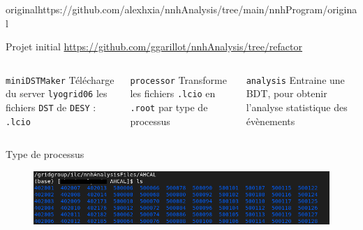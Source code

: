 \documentclass[9pt]{beamer}
\begin{document}
\begin{frame}{original}{https://github.com/alexhxia/nnhAnalysis/tree/main/nnhProgram/original}

\begin{block}{Projet initial}
	\url{https://github.com/ggarillot/nnhAnalysis/tree/refactor}
\end{block}

\begin{columns}

	\begin{column}{0.33\textwidth}
		\begin{block}{\texttt{miniDSTMaker}}
			Télécharge du server \texttt{lyogrid06} les fichiers \texttt{DST} de \texttt{DESY} : \texttt{.lcio}
		\end{block}
	\end{column}
	
	\begin{column}{0.33\textwidth}
		\begin{block}{\texttt{processor}}
			Transforme les fichiers \texttt{.lcio} en \texttt{.root} par type de processus
		\end{block}
	\end{column}
	
	\begin{column}{0.33\textwidth}
		\begin{block}{\texttt{analysis}}
			Entraine une BDT, pour obtenir l'analyse statistique des évènements
		\end{block}
	\end{column}

\end{columns}

\begin{block}{Type de processus}
	\begin{figure}
		\center
		\includegraphics[width=\textwidth]{../img/listeProcessus.png} 
	\end{figure}
\end{block}

\end{frame}

\end{document}
